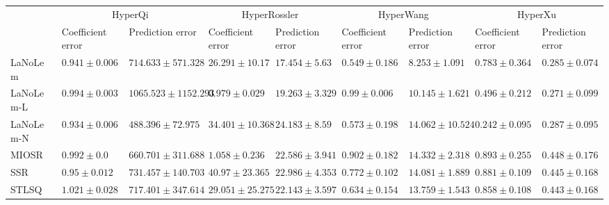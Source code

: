 \begin{table*}
{\begin{tabular}{lllllllll}
 & \multicolumn{2}{c}{HyperQi} & \multicolumn{2}{c}{HyperRossler} & \multicolumn{2}{c}{HyperWang} & \multicolumn{2}{c}{HyperXu} \\
 & Coefficient error & Prediction error & Coefficient error & Prediction error & Coefficient error & Prediction error & Coefficient error & Prediction error \\
\midrule
LaNoLem & $0.941\pm 0.006$ & $714.633\pm 571.328$ & $26.291\pm 10.17$ & $\mathbf{17.454}\pm 5.63$ & $\mathbf{0.549}\pm 0.186$ & $\mathbf{8.253}\pm 1.091$ & $0.783\pm 0.364$ & $0.285\pm 0.074$ \\
LaNoLem-L & $0.994\pm 0.003$ & $1065.523\pm 1152.293$ & $\mathbf{0.979}\pm 0.029$ & $19.263\pm 3.329$ & $0.99\pm 0.006$ & $10.145\pm 1.621$ & $0.496\pm 0.212$ & $\mathbf{0.271}\pm 0.099$ \\
LaNoLem-N & $\mathbf{0.934}\pm 0.006$ & $\mathbf{488.396}\pm 72.975$ & $34.401\pm 10.368$ & $24.183\pm 8.59$ & $0.573\pm 0.198$ & $14.062\pm 10.524$ & $\mathbf{0.242}\pm 0.095$ & $0.287\pm 0.095$ \\
MIOSR & $0.992\pm 0.0$ & $660.701\pm 311.688$ & $1.058\pm 0.236$ & $22.586\pm 3.941$ & $0.902\pm 0.182$ & $14.332\pm 2.318$ & $0.893\pm 0.255$ & $0.448\pm 0.176$ \\
SSR & $0.95\pm 0.012$ & $731.457\pm 140.703$ & $40.97\pm 23.365$ & $22.986\pm 4.353$ & $0.772\pm 0.102$ & $14.081\pm 1.889$ & $0.881\pm 0.109$ & $0.445\pm 0.168$ \\
STLSQ & $1.021\pm 0.028$ & $717.401\pm 347.614$ & $29.051\pm 25.275$ & $22.143\pm 3.597$ & $0.634\pm 0.154$ & $13.759\pm 1.543$ & $0.858\pm 0.108$ & $0.443\pm 0.168$ \\

\midrule


\end{tabular}}
\end{table*}
